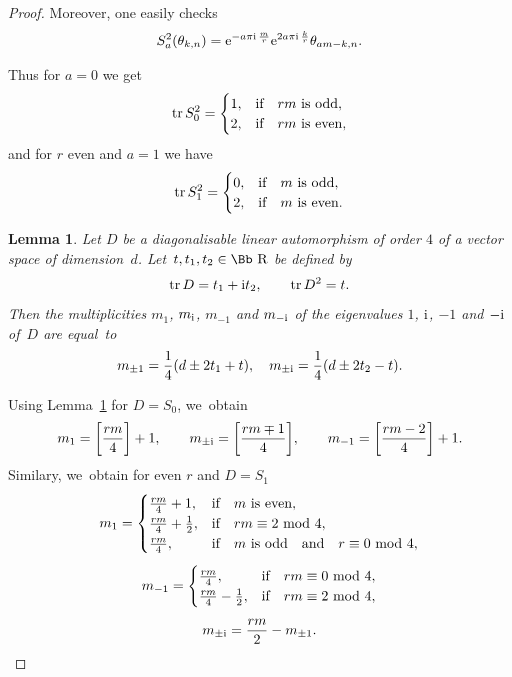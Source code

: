 \documentclass[pdftex]{sigma}
\newcommand\RR{{\mbox{\Bb R}}}
\newcommand{\tr}{\mathop{{\rm tr}}}
\numberwithin{equation}{section}
\newtheorem{Lemma}[Theorem]{Lemma}
\begin{document}
\begin{proof}
Moreover, one easily checks
\begin{gather*}
S_a^2(\theta_{k,n})={\rm e}^{-a\pi {\rm i}\,\frac{m}{r}}{\rm e}^{2a\pi {\rm i}\,\frac{k}{r}}\theta_{am-k,n}.
\end{gather*}

Thus for $a=0$ we get
\begin{gather*}
\tr S_0^2=\begin{cases}
1,&\text{if\quad $rm$ is odd},
\\
2,&\text{if\quad $rm$ is even},
\end{cases}
\end{gather*}
and for $r$ even and $a=1$ we have
\begin{gather*}
\tr S_1^2=\begin{cases}
0,&\text{if\quad $m$ is odd},
\\
2,&\text{if\quad $m$ is even}.
\end{cases}
\end{gather*}

\begin{Lemma}\label{LD4}
Let $D$ be a diagonalisable linear automorphism of order $4$ of a vector space of dimension~$d$. Let~$t, t_1, t_2\in \RR$ be defined by
\begin{gather*}
\tr D= t_1+{\rm i} t_2,\qquad \tr D^2= t.
\end{gather*}
Then the multiplicities $m_1$, $m_{\rm i}$, $m_{-1}$ and $m_{-{\rm i}}$ of the eigenvalues $1$, ${\rm i}$, $-1$ and $-{\rm i}$ of~$D$ are equal~to
\begin{gather*}
m_{\pm1}= \frac1{4}(d\pm 2t_1+t),\quad
m_{\pm {\rm i}}= \frac1{4}(d\pm 2t_2-t).
\end{gather*}
\end{Lemma}
%
Using Lemma~\ref{LD4} for $D=S_0$, we~obtain
\begin{gather*}
m_1=\bigg[\frac{rm}{4}\bigg]+1, \qquad
m_{\pm {\rm i}}=\bigg[\frac{rm\mp 1}{4}\bigg], \qquad
m_{-1}=\bigg[\frac{rm-2}{4}\bigg]+1.
\end{gather*}
Similary, we~obtain for even $r$ and $D=S_1$
\begin{gather*}
m_1=\begin{cases}
\frac{rm}{4}+1,&\text{if\quad $m$ is even},
\\
\frac{rm}{4}+\frac{1}{2},&\text{if}\quad rm\equiv 2\ {\rm mod}\ 4,
\\
\frac{rm}{4},&\text{if\quad $m$ is odd\quad and\quad $r\equiv 0\ {\rm mod}\ 4$},
\end{cases}
\\[1ex]
m_{-1}=\begin{cases}
\frac{rm}{4},&\text{if}\quad rm\equiv 0\ {\rm mod}\ 4,
\\
\frac{rm}{4}-\frac{1}{2},&\text{if}\quad rm\equiv 2\ {\rm mod}\ 4,
\end{cases}
\\[1ex]
m_{\pm {\rm i}}=\frac{rm}2-m_{\pm 1}.
\end{gather*}


\end{proof}
\end{document}
